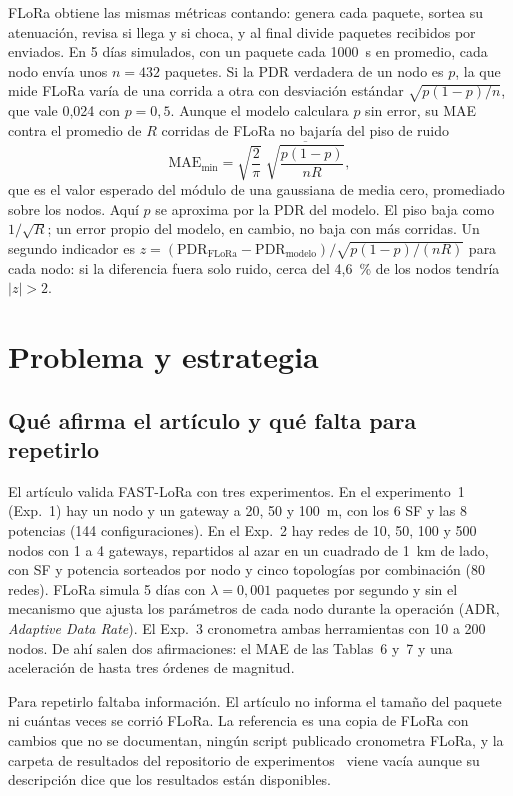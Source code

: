 \documentclass[conference,a4paper]{IEEEtran}
\begin{document}
FLoRa obtiene las mismas métricas contando: genera cada paquete, sortea su atenuación, revisa si llega y si choca, y al final divide paquetes recibidos por enviados. En 5 días simulados, con un paquete cada 1000~s en promedio, cada nodo envía unos $n=432$ paquetes. Si la PDR verdadera de un nodo es $p$, la que mide FLoRa varía de una corrida a otra con desviación estándar $\sqrt{p(1-p)/n}$, que vale 0,024 con $p=0{,}5$. Aunque el modelo calculara $p$ sin error, su MAE contra el promedio de $R$ corridas de FLoRa no bajaría del piso de ruido
\begin{equation}
  \mathrm{MAE}_{\min}=\sqrt{\frac{2}{\pi}}\;\overline{\sqrt{\frac{p(1-p)}{nR}}},
  \label{eq:piso}
\end{equation}
que es el valor esperado del módulo de una gaussiana de media cero, promediado sobre los nodos. Aquí $p$ se aproxima por la PDR del modelo. El piso baja como $1/\sqrt{R}$; un error propio del modelo, en cambio, no baja con más corridas. Un segundo indicador es $z=(\mathrm{PDR}_{\mathrm{FLoRa}}-\mathrm{PDR}_{\mathrm{modelo}})/\sqrt{p(1-p)/(nR)}$ para cada nodo: si la diferencia fuera solo ruido, cerca del 4,6~\% de los nodos tendría $|z|>2$.

\section{Problema y estrategia}

\subsection{Qué afirma el artículo y qué falta para repetirlo}

El artículo valida FAST-LoRa con tres experimentos. En el experimento~1 (Exp.~1) hay un nodo y un gateway a 20, 50 y 100~m, con los 6 SF y las 8 potencias (144 configuraciones). En el Exp.~2 hay redes de 10, 50, 100 y 500 nodos con 1 a 4 gateways, repartidos al azar en un cuadrado de 1~km de lado, con SF y potencia sorteados por nodo y cinco topologías por combinación (80 redes). FLoRa simula 5 días con $\lambda=0{,}001$ paquetes por segundo y sin el mecanismo que ajusta los parámetros de cada nodo durante la operación (ADR, \emph{Adaptive Data Rate}). El Exp.~3 cronometra ambas herramientas con 10 a 200 nodos. De ahí salen dos afirmaciones: el MAE de las Tablas~6 y~7 y una aceleración de hasta tres órdenes de magnitud.

Para repetirlo faltaba información. El artículo no informa el tamaño del paquete ni cuántas veces se corrió FLoRa. La referencia es una copia de FLoRa con cambios que no se documentan, ningún script publicado cronometra FLoRa, y la carpeta de resultados del repositorio de experimentos~\cite{repomarltc} viene vacía aunque su descripción dice que los resultados están disponibles.
\end{document}
